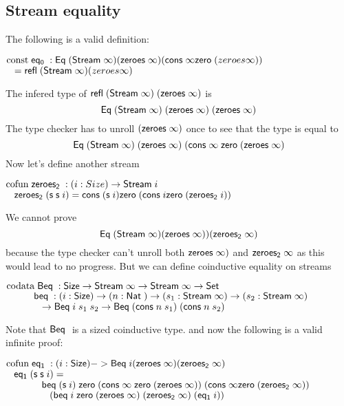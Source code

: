 \subsection{Stream equality}
The following is a valid definition:
\begin{bsp}
$\mathrm{const}\; \mathsf{eq_0}\; : \mathsf{Eq}\; (\mathsf{Stream}\; \infty) (\mathsf{zeroes}\; \infty) (\mathsf{cons}\; \infty \mathsf{zero}\; (zeroes \infty))$\\
$\hspace*{3mm} = \mathsf{refl}\; (\mathsf{Stream}\; \infty) (zeroes \infty)$
\end{bsp}
The infered type of $\mathsf{refl}\; (\mathsf{Stream}\; \infty) \; (\mathsf{zeroes}\; \infty)$ is 
\[\mathsf{Eq}\; (\mathsf{Stream}\; \infty) \; (\mathsf{zeroes}\; \infty) \; (\mathsf{zeroes}\; \infty)\]
The type checker has to unroll $(\mathsf{zeroes}\; \infty)$ once to see that the type is equal to 
\[
\mathsf{Eq}\; (\mathsf{Stream}\; \infty) \; (\mathsf{zeroes}\; \infty) \; (\mathsf{cons}\; \infty \; \mathsf{zero}\; (\mathsf{zeroes}\; \infty)
\]
Now let's define another stream
\begin{bsp}
$\mathrm{cofun}\; \mathsf{zeroes_2}\;: ( i : Size ) \rightarrow{\mathsf{Stream}\;i} $ \\
$\hspace*{3mm} \mathsf{zeroes_2}\; (\mathsf{s}\; \mathsf{s}\; i) = \mathsf{cons}\; (\mathsf{s}\; i) \mathsf{zero}\; (\mathsf{cons}\; i \mathsf{zero}\; (\mathsf{zeroes_2}\; i))$\\
\end{bsp}
We cannot prove \[\mathsf{Eq}\; (\mathsf{Stream}\; \infty) (\mathsf{zeroes}\; \infty)) (\mathsf{zeroes_2}\; \infty)\]
because the type checker can't unroll both $\mathsf{zeroes}\; \infty)$ and $\mathsf{zeroes_2}\; \infty$ as
this would lead to no progress.
But we can define coinductive equality  on streams \cite{coquand-infinite}
\begin{bsp}
$\mathrm{codata}\; \mathsf{Beq}\; : \mathsf{Size} \rightarrow \mathsf{Stream}\; \infty \rightarrow \mathsf{Stream}\; \infty \rightarrow \mathsf{Set}$\\
$ \spcx \beq : (i : \Size ) \ra ( n : \Nat ) \ra (s_1 : \Stream \infty ) \ra (s_2 : \Stream \infty )$\\
$ \spcx \spc  \ra \beqd i \; s_1 \; s_2 \ra \beqd (\cons n \; s_1) \; (\cons n \; s_2)$
\end{bsp}
Note that $\mathsf{Beq}\;$ is a sized coinductive type.
and now the following is a valid infinite proof:
\begin{bsp}
$\mathrm{cofun}\; \mathsf{eq_1}\; : (i : \mathsf{Size} ) -> \mathsf{Beq}\; i (\mathsf{zeroes}\; \infty) (\mathsf{zeroes_2}\; \infty)$\\
$\hspace*{3mm} \mathsf{eq_1}\; (\mathsf{s}\; \mathsf{s}\; i) = $\\
$\spc \spcx \beq (\s i) \; \zero (\cons \infty \; \zero (\zeroes \infty)) \; (\cons \infty \zero (\zeroest \infty))$\\ 
$\spc \spcx \spc (\beq i \; \zero (\zeroes \infty) \; (\zeroest \infty) \; (\eqt i))$
\end{bsp}
